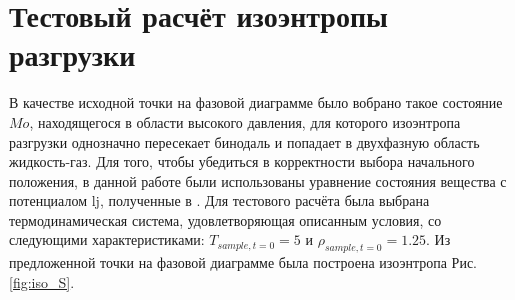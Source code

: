 \section{\label{sec 3}Тестовый расчёт изоэнтропы разгрузки}

В качестве исходной точки на фазовой диаграмме было вобрано такое состояние $Mo$, находящегося в области высокого давления, для которого изоэнтропа разгрузки однозначно пересекает бинодаль и попадает в двухфазную область жидкость-газ. Для того, чтобы убедиться в корректности выбора начального положения, в данной работе были использованы уравнение состояния вещества с потенциалом \acrshort{lj}, полученные в \cite{Ahmed:JCP:2009, Heier:MP:2018,Watanabe:JCP:2012, Adidharma:JCP:2016, THOL:JPCRF:2016}. Для тестового расчёта была выбрана термодинамическая система, удовлетворяющая описанным условия,  со следующими характеристиками: $T_{sample, t=0} = 5$ и $\rho_{sample, t=0} = 1.25$. Из предложенной точки на фазовой диаграмме была построена изоэнтропа Рис.\ref{fig:iso_S}.    

